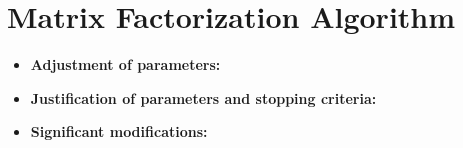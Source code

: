\section{Matrix Factorization Algorithm}
\medskip
\begin{itemize}
  \item \textbf{Adjustment of parameters:}
  \item \textbf{Justification of parameters and stopping criteria:}
  \item \textbf{Significant modifications:}
\end{itemize}


